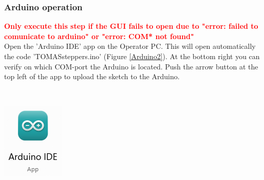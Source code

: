 \documentclass[fleqn,a4paper,20pt]{article}
\begin{document}
\begin{minipage}{.76\textwidth}
\subsubsection{Arduino operation} 
\textcolor{red}{\textbf{Only execute this step if the GUI fails to open due to "error: failed to comunicate to arduino" or "error: COM* not found"}}\\

Open the 'Arduino IDE' app on the Operator PC. This will open automatically the code 'TOMASsteppers.ino' (Figure \ref{Arduino2}). At the bottom right you can verify on which COM-port the Arduino is located. Push the arrow button at the top left of the app to upload the sketch to the Arduino.\\


\end{minipage}
\begin{minipage}{.02\textwidth}
$\ $\\
\end{minipage}
\begin{minipage}{.2\textwidth}
\centering
\includegraphics[width=\linewidth]{Arduino1}
\end{minipage}
\end{document}
